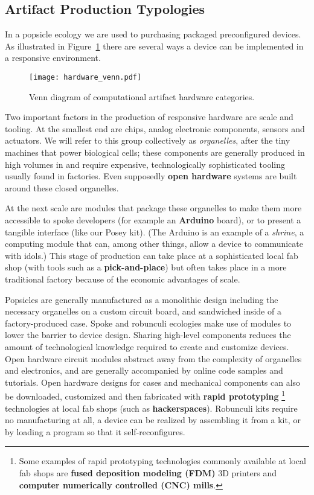\subsection{Artifact Production Typologies}
%
In a popsicle ecology we are used to purchasing packaged preconfigured devices. As illustrated in Figure~\ref{fig:hardware_venn} there are several ways a device can be implemented in a responsive environment. 

\begin{figure}[]
  \centering
    \texttt{[image: hardware\_venn.pdf]}
  \caption{Venn diagram of computational artifact hardware categories.}
  \label{fig:hardware_venn}
\end{figure}

Two important factors in the production of responsive hardware are scale and tooling. 
At the smallest end are chips, analog electronic components, sensors and actuators. 
We will refer to this group collectively as \emph{organelles}, after the tiny machines that power biological cells; these components are generally produced in high volumes in and require expensive, technologically sophisticated tooling usually found in factories. 
Even supposedly \textbf{open hardware} systems are built around these closed organelles. 

At the next scale are modules that package these organelles to make them more accessible to spoke developers (for example an \textbf{Arduino} board), or to present a tangible interface (like our Posey kit). 
(The Arduino is an example of a \emph{shrine}, a computing module that can, among other things, allow a device to communicate with idols.) 
This stage of production can take place at a sophisticated local fab shop (with tools such as a \textbf{pick-and-place}) but often takes place in a more traditional factory because of the economic advantages of scale.

Popsicles are generally manufactured as a monolithic design including the necessary organelles on a custom circuit board, and sandwiched inside of a factory-produced case. 
Spoke and robunculi ecologies make use of modules to lower the barrier to device design. 
Sharing high-level components reduces the amount of technological knowledge required to create and customize devices.
Open hardware circuit modules abstract away from the complexity of organelles and electronics, and are generally accompanied by online code samples and tutorials. 
Open hardware designs for cases and mechanical components can also be downloaded, customized and then fabricated with \textbf{rapid prototyping}%
\footnote{Some examples of rapid prototyping technologies commonly available at local fab shops are \textbf{fused deposition modeling (FDM)} 3D printers and \textbf{computer numerically controlled (CNC) mills}.}
technologies at local fab shops (such as \textbf{hackerspaces}).
Robunculi kits require no manufacturing at all, a device can be realized by assembling it from a kit, or by loading a program so that it self-reconfigures.

